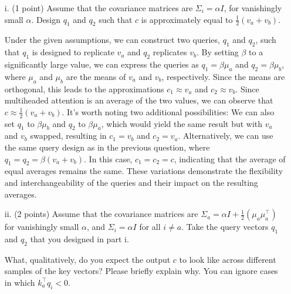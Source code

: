 \documentclass[letterpaper,12pt]{article}
\begin{document}
	\begin{itemize}
	\item[i.] 
		(1 point) Assume that the covariance matrices are $\Sigma_i = \alpha I$, for vanishingly small $\alpha$. Design $q_1$
		and $q_2$ such that $c$ is approximately equal to $\frac{1}{2}(v_a + v_b)$.
		
		\textcolor{blue!70}{ Under the given assumptions, we can construct two queries, $q_1$ and $q_2$, such that $q_1$ is designed to replicate $v_a$ and $q_2$ replicates $v_b$. By setting $\beta$ to a significantly large value, we can express the queries as $q_1 = \beta\mu_a$ and $q_2 = \beta\mu_b$, where $\mu_a$ and $\mu_b$ are the means of $v_a$ and $v_b$, respectively. Since the means are orthogonal, this leads to the approximations $c_1 \approx v_a$ and $c_2 \approx v_b$. Since multiheaded attention is an average of the two values, we can observe that $c \approx \frac{1}{2}(v_a + v_b)$.
		It's worth noting two additional possibilities:
		We can also set $q_1$ to $\beta\mu_b$ and $q_2$ to $\beta\mu_a$, which would yield the same result but with $v_a$ and $v_b$ swapped, resulting in $c_1 = v_b$ and $c_2 = v_a$.
		Alternatively, we can use the same query design as in the previous question, where $q_1 = q_2 = \beta(v_a + v_b)$. In this case, $c_1 = c_2 = c$, indicating that the average of equal averages remains the same.
		These variations demonstrate the flexibility and interchangeability of the queries and their impact on the resulting averages.}
	
	\item[ii.] 
		(2 points) Assume that the covariance matrices are $\Sigma_a = \alpha I + \frac{1}{2}(\mu_a \mu_a^\top)$ for vanishingly small $\alpha$, and $\Sigma_i = \alpha I$ for all $i \neq a$. Take the query vectors $q_1$ and $q_2$ that you designed in part i.
		
		What, qualitatively, do you expect the output $c$ to look like across different samples of the key
		vectors? Please briefly explain why. You can ignore cases in which $k^\top_a q_i < 0$.
		

\end{itemize}
\end{document}
